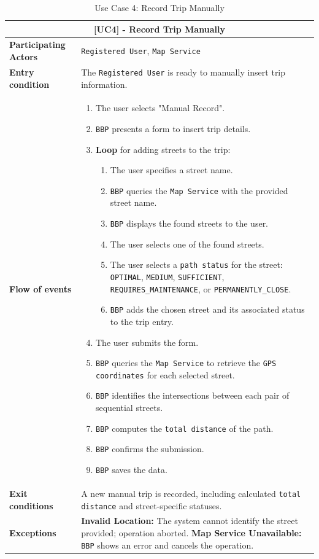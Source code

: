 \begin{table}[H]
\centering
\begin{tabularx}{\textwidth}{|l|X|}
\hline
\multicolumn{2}{|c|}{\textbf{[UC4] - Record Trip Manually}} \\ \hline
\textbf{Participating Actors} & \texttt{Registered User}, \texttt{Map Service} \\ \hline
\textbf{Entry condition}      & The \texttt{Registered User} is ready to manually insert trip information. \\ \hline
\textbf{Flow of events}       & 
\begin{enumerate}
    \item The user selects "Manual Record".
    \item \texttt{BBP} presents a form to insert trip details.
    \item \textbf{Loop} for adding streets to the trip:
    \begin{enumerate}
        \item The user specifies a street name.
        \item \texttt{BBP} queries the \texttt{Map Service} with the provided street name.
        \item \texttt{BBP} displays the found streets to the user.
        \item The user selects one of the found streets.
        \item The user selects a \texttt{path status} for the street: \texttt{OPTIMAL}, \texttt{MEDIUM}, \texttt{SUFFICIENT}, \texttt{REQUIRES\_MAINTENANCE}, or \texttt{PERMANENTLY\_CLOSE}.
        \item \texttt{BBP} adds the chosen street and its associated status to the trip entry.
    \end{enumerate}
    \item The user submits the form.
    \item \texttt{BBP} queries the \texttt{Map Service} to retrieve the \texttt{GPS coordinates} for each selected street.
    \item \texttt{BBP} identifies the intersections between each pair of sequential streets.
    \item \texttt{BBP} computes the \texttt{total distance} of the path.
    \item \texttt{BBP} confirms the submission.
    \item \texttt{BBP} saves the data.
\end{enumerate} \\ \hline
\textbf{Exit conditions}      & A new manual trip is recorded, including calculated \texttt{total distance} and street-specific statuses. \\ \hline
\textbf{Exceptions}           & 
\textbf{Invalid Location:} The system cannot identify the street provided; operation aborted. \newline
\textbf{Map Service Unavailable:} \texttt{BBP} shows an error and cancels the operation. \\ \hline
\end{tabularx}
\caption{Use Case 4: Record Trip Manually}
\label{tab:uc4}
\end{table}

